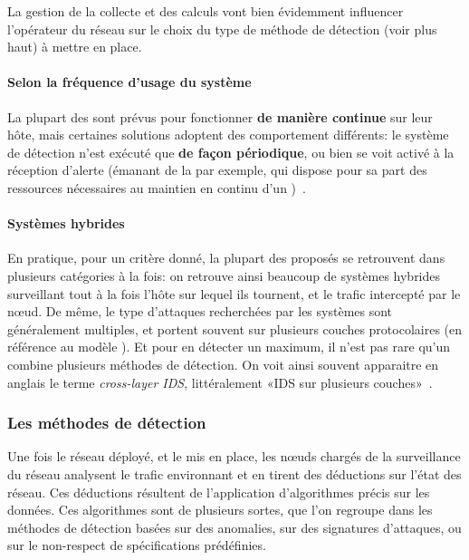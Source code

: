 La gestion de la collecte et des calculs vont bien évidemment influencer l'opérateur du réseau sur le choix du type de méthode de détection (voir plus haut) à mettre en place.

        \paragraph{Selon la fréquence d'usage du système}
La plupart des \IDS sont prévus pour fonctionner \textbf{de manière continue} sur leur hôte, mais certaines solutions adoptent des comportement différents: le système de détection n'est exécuté que \textbf{de façon périodique}, ou bien se voit activé à la réception d'alerte (émanant de la \sdb par exemple, qui dispose pour sa part des ressources nécessaires au maintien en continu d'un \IDS)~\cite{BMS13}.

        \paragraph{Systèmes hybrides}
En pratique, pour un critère donné, la plupart des \IDS proposés se retrouvent dans plusieurs catégories à la fois: on retrouve ainsi beaucoup de systèmes hybrides surveillant tout à la fois l'hôte sur lequel ils tournent, et le trafic intercepté par le nœud.
De même, le type d'attaques recherchées par les systèmes sont généralement multiples, et portent souvent sur plusieurs couches protocolaires (en référence au modèle \tcpip).
Et pour en détecter un maximum, il n'est pas rare qu'un \IDS combine plusieurs méthodes de détection.
On voit ainsi souvent apparaitre en anglais le terme \textit{cross-layer IDS}, littéralement «IDS sur plusieurs couches»~\cite{BMS13}.

    \subsubsection{Les méthodes de détection}\label{ea:sss:detect}
Une fois le réseau déployé, et le \ids mis en place, les nœuds chargés de la surveillance du réseau analysent le trafic environnant et en tirent des déductions sur l'état des réseau.
Ces déductions résultent de l'application d'algorithmes précis sur les données.
Ces algorithmes sont de plusieurs sortes, que l'on regroupe dans les méthodes de détection basées sur des anomalies, sur des signatures d'attaques, ou sur le non-respect de spécifications prédéfinies.

